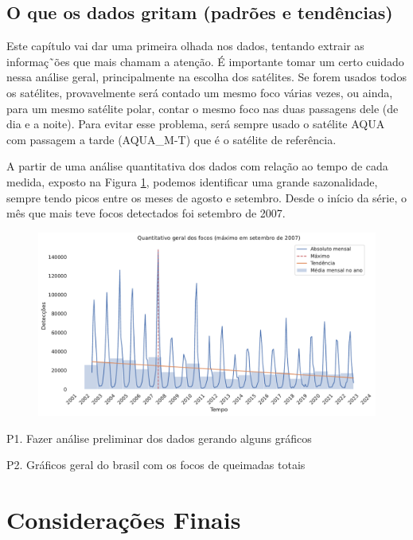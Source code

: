 \documentclass[cic,tc]{iiufrgs}
\begin{document}
\section{O que os dados gritam (padrões e tendências)}

Este capítulo vai dar uma primeira olhada nos dados, tentando extrair as 
informaç˜ões que mais chamam a atenção. É importante tomar um certo cuidado nessa 
análise geral, principalmente na escolha dos satélites. Se forem usados todos os 
satélites, provavelmente será contado um mesmo foco várias vezes, ou ainda, para um 
mesmo satélite polar, contar o mesmo foco nas duas passagens dele (de dia e a 
noite). Para evitar esse problema, será sempre usado o satélite AQUA com passagem a 
tarde (AQUA\_M-T) que é o satélite de referência. \par

A partir de uma análise quantitativa dos dados com relação ao tempo de cada medida,
exposto na Figura \ref{fig:quantitativo_geral}, podemos identificar uma grande 
sazonalidade, sempre tendo picos entre os meses de agosto e setembro. Desde o 
início da série, o mês que mais teve focos detectados foi setembro de 2007. 

\begin{figure}
    \caption{}
    \begin{center}
        \includegraphics[width=35em]{quantitativo_geral}
    \end{center}
    \label{fig:quantitativo_geral}
\end{figure}


P1. Fazer análise preliminar dos dados gerando alguns gráficos \par
P2. Gráficos geral do brasil com os focos de queimadas totais \cite{geographicDataSciencePython} \par



\chapter{Considerações Finais}





\end{document}
